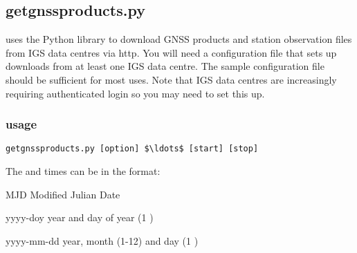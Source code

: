 \subsection{getgnssproducts.py}

\hypertarget{h:fetchigs}{}

 uses the Python library  to download GNSS products and station observation
files from IGS data centres via http. You will need a configuration file that sets up downloads from at least one IGS data
centre. The sample configuration file should be sufficient for most uses. 
Note that IGS data centres are increasingly requiring authenticated login so you may need to set this up.

\subsubsection{usage}

\begin{lstlisting}[mathescape=true]
getgnssproducts.py [option] $\ldots$ [start] [stop]
\end{lstlisting}

The  and  times can be in the format:
\begin{description*}
\item[MJD] Modified Julian Date
\item[yyyy-doy] year and day of year (1 \textellipsis)
\item[yyyy-mm-dd] year, month (1-12) and day (1 \textellipsis)
\end{description*}

